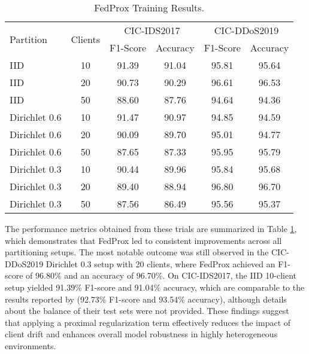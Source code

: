 \begin{table}[h]
    \caption{FedProx Training Results.}
    \centering
    \begin{tabular}{l|c|c|c|c|c}
        \multirow{2}{*}{Partition} & \multirow{2}{*}{Clients} & \multicolumn{2}{|c|}{CIC-IDS2017} & \multicolumn{2}{|c}{CIC-DDoS2019} \\
        \cline{3-6} & & F1-Score & Accuracy & F1-Score & Accuracy \\
        \hline\hline
        IID & 10 & 91.39 & 91.04 & 95.81 & 95.64 \\
        IID & 20 & 90.73 & 90.29 & 96.61 & 96.53 \\
        IID & 50 & 88.60 & 87.76 & 94.64 & 94.36 \\
        Dirichlet 0.6 & 10 & 91.47 & 90.97 & 94.85 & 94.59 \\
        Dirichlet 0.6 & 20 & 90.09 & 89.70 & 95.01 & 94.77 \\
        Dirichlet 0.6 & 50 & 87.65 & 87.33 & 95.95 & 95.79 \\
        Dirichlet 0.3 & 10 & 90.44 & 89.96 & 95.84 & 95.68 \\
        Dirichlet 0.3 & 20 & 89.40 & 88.94 & 96.80 & 96.70 \\
        Dirichlet 0.3 & 50 & 87.56 & 86.49 & 95.56 & 95.37 \\
    \end{tabular}
    \label{tbl:fedprox_results}
\end{table}

The performance metrics obtained from these trials are summarized in Table \ref{tbl:fedprox_results}, which demonstrates that FedProx led to consistent improvements across all partitioning setups. The most notable outcome was still observed in the CIC-DDoS2019 Dirichlet 0.3 setup with 20 clients, where FedProx achieved an F1-score of 96.80\% and an accuracy of 96.70\%. On CIC-IDS2017, the IID 10-client setup yielded 91.39\% F1-score and 91.04\% accuracy, which are comparable to the results reported by \cite{IDRISSI2023121000} (92.73\% F1-score and 93.54\% accuracy), although details about the balance of their test sets were not provided. These findings suggest that applying a proximal regularization term effectively reduces the impact of client drift and enhances overall model robustness in highly heterogeneous environments.

